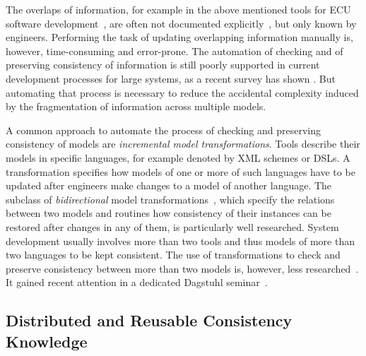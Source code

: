 The overlaps of information, for example in the above mentioned tools for \gls{ECU} software development~\cite{giese2010a}, are often not documented explicitly~\cite{mazkatli2017ase}, but only known by engineers.
Performing the task of updating overlapping information manually is, however, time-consuming and error-prone.
The automation of checking and of preserving consistency of information is still poorly supported in current development processes for large systems, as a recent survey has shown .
But automating that process is necessary to reduce the accidental complexity induced by the fragmentation of information across multiple models.

A common approach to automate the process of checking and preserving consistency of models are \emph{incremental model transformations}.
Tools describe their models in specific languages, for example denoted by \gls{XML} schemes or \glspl{DSL}.
A transformation specifies how models of one or more of such languages have to be updated after engineers make changes to a model of another language.
The subclass of \emph{bidirectional} model transformations~\cite{stevens2010sosym}, which specify the relations between two models and routines how consistency of their instances can be restored after changes in any of them, is particularly well researched.
System development usually involves more than two tools and thus models of more than two languages to be kept consistent.
The use of transformations to check and preserve consistency between more than two models is, however, less researched~\cite{stevens2020BidirectionalTransformationLarge-SoSym}.
It gained recent attention in a dedicated Dagstuhl seminar~\cite{cleve2019dagstuhl}.


\subsection{Distributed and Reusable Consistency Knowledge} %


